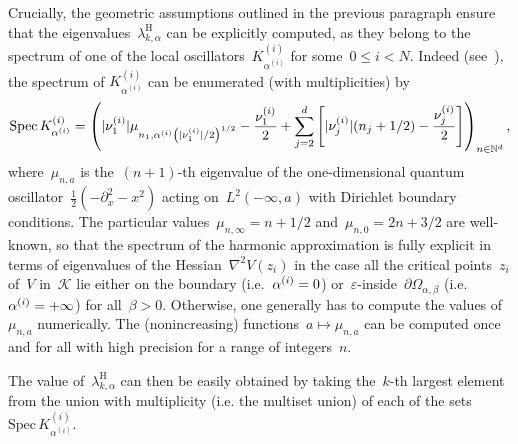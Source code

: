     Crucially, the geometric assumptions outlined in the previous paragraph ensure that the eigenvalues~$\lambda_{k,\alpha}^{\mathrm{H}}$ can be explicitly computed, as they belong to the spectrum of one of the local oscillators~$K_{\alpha^{(i)}}^{(i)}$ for some~$0\leq i<N$.
    Indeed (see~\cite[Section 4.2]{BLS25a}), the spectrum of $K_{\alpha^{(i)}}^{(i)}$ can be enumerated (with multiplicities) by
    \begin{equation}
        \label{03:eq:harmonic_l2}
        \mathrm{Spec}\,K_{\alpha^{(i)}}^{(i)}=\left(|\nu^{(i)}_{1}|\mu_{n_1,\alpha^{(i)}\left(|\nu^{(i)}_{1}|/2\right)^{1/2}}-\frac{\nu^{(i)}_{1}}{2}+\sum_{j=2}^d\left[|\nu^{(i)}_{j}|(n_j+1/2)-\frac{\nu^{(i)}_{j}}{2}\right]\right)_{n\in\mathbb{N}^d},
    \end{equation}
    where~$\mu_{n,a}$ is the~$(n+1)$-th eigenvalue of the one-dimensional quantum oscillator~$\frac12(-\partial_x^2-x^2)$ acting on~$L^2(-\infty,a)$ with Dirichlet boundary conditions.
    The particular values~$\mu_{n,\infty}=n+1/2$ and~$\mu_{n,0}=2n+3/2$ are well-known, so that the spectrum of the harmonic approximation is fully explicit in terms of eigenvalues of the Hessian~$\nabla^2 V(z_i)$ in the case all the critical points~$z_i$ of~$V$ in~$\mathcal K$ lie either on the boundary (i.e.~$\alpha^{(i)}=0$) or~$\varepsilon$-inside~$\partial\Omega_{\alpha,\beta}$ (i.e.~$\alpha^{(i)}=+\infty$) for all~$\beta>0$. Otherwise, one generally has to compute the values of~$\mu_{n,a}$ numerically. The (nonincreasing) functions~$a\mapsto \mu_{n,a}$ can be computed once and for all with high precision for a range of integers~$n$.

    The value of~$\lambda_{k,\alpha}^{\mathrm{H}}$ can then be easily obtained by taking the~$k$-th largest element from the union with multiplicity (i.e. the multiset union) of each of the sets~$\mathrm{Spec}\,K_{\alpha^{(i)}}^{(i)}$.
    
